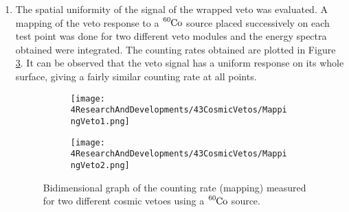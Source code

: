 \begin{enumerate}
\item{} The spatial uniformity of the signal of the wrapped veto was evaluated. A mapping of the veto response to a $\ce{^{60}Co}$ source placed successively on each test point was done for two different veto modules and the energy spectra obtained were integrated. The counting rates obtained are plotted in Figure \ref{fig:MappingVetos}. It can be observed that the veto signal has a uniform response on its whole surface, giving a fairly similar counting rate at all points.
\begin{figure}
\centering
    \begin{subfigure}[b]{0.9\textwidth}
    \centering
    \texttt{[image: 4ResearchAndDevelopments/43CosmicVetos/MappingVeto1.png]}  
    \caption{\label{subfig:MappingVeto1}}
    \end{subfigure}
    \hfill
    \begin{subfigure}[b]{0.9\textwidth}
    \centering
    \texttt{[image: 4ResearchAndDevelopments/43CosmicVetos/MappingVeto2.png]}  
    \caption{\label{subfig:MappingVeto2}}
    \end{subfigure}
 \caption{Bidimensional graph of the counting rate (mapping) measured for two different cosmic vetoes using a $\ce{^{60}Co}$ source.}
 \label{fig:MappingVetos}
\end{figure}
\end{enumerate}
